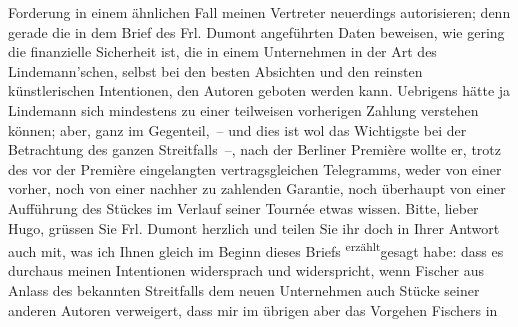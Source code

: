 \begin{ledgroupsized}[t]{13cm}
               Forderung in einem ähnlichen Fall meinen Vertreter neuerdings autorisieren; denn
               gerade die in dem Brief des Frl. Dumont
               angeführten Daten beweisen, wie gering die finanzielle Sicherheit ist, die in einem
               Unternehmen in der Art des Lindemann’schen,
               selbst bei den besten Absichten und den reinsten künstlerischen Intentionen, den
               Autoren geboten werden kann.\pend
           \pstart
           Uebrigens hätte ja Lindemann sich mindestens
               zu einer teilweisen vorherigen Zahlung verstehen können; aber, ganz im Gegenteil, –
               und dies ist wol das Wichtigste bei der Betrachtung des ganzen Streitfalls –, nach
               der Berliner Première wollte er, trotz des vor
               der Première eingelangten vertragsgleichen Telegramms, weder von einer vorher, noch
               von einer nachher zu zahlenden Garantie, noch überhaupt von einer Aufführung des Stückes im Verlauf seiner
               Tournée etwas wissen.\pend
           \pstart
           {\pb}Bitte, lieber Hugo, grüssen Sie Frl. Dumont herzlich und teilen Sie ihr doch in
               Ihrer Antwort auch mit, was ich Ihnen gleich im Beginn dieses Briefs \substVorne{}\textsuperscript{erzählt}{\allowbreak}\substDazwischen{}gesagt\substHinten{} habe: dass es durchaus meinen Intentionen widersprach und widerspricht, wenn
                  Fischer aus Anlass des bekannten
               Streitfalls dem neuen Unternehmen auch Stücke seiner anderen Autoren verweigert, dass
               mir im übrigen aber das Vorgehen Fischers in

\end{ledgroupsized}

